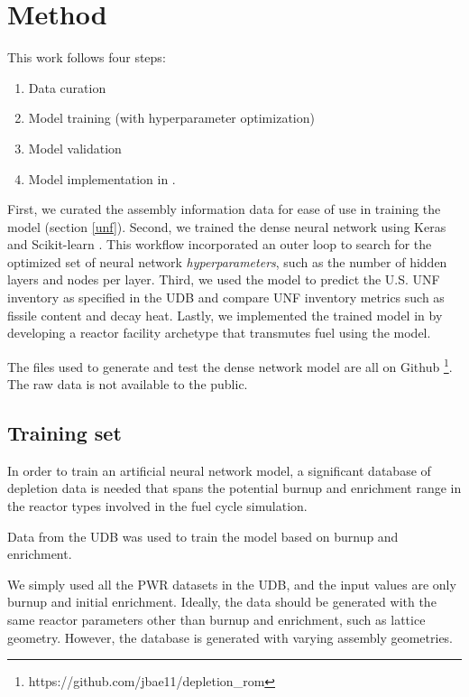 \section{Method}

This work follows four steps:

\begin{enumerate}
\item Data curation
\item Model training (with hyperparameter optimization)
\item Model validation
\item Model implementation in \Cyclus.
\end{enumerate}


First, we curated the
assembly information data for ease of use in training the model
(section \ref{unf}).
Second, we trained the dense neural network using Keras \cite{collet_keras_2015}
and Scikit-learn \cite{pedregosa_scikit-learn_2011}.
This workflow incorporated an outer loop to
search for the optimized set of neural network \textit{hyperparameters},
such as the number of hidden layers and nodes per layer.
Third, we used the model to predict the U.S. \gls{UNF}
inventory as specified in the \gls{UDB} and compare
\gls{UNF} inventory metrics such as fissile content
and decay heat. Lastly, we implemented the trained
model in \Cyclus by developing a reactor facility archetype
that transmutes fuel using the model.

The files used to generate and test the dense network
model are all on Github \footnote{https://github.com/jbae11/depletion\_rom}.
The raw data
is not available to the public.

\subsection{Training set}

In order to train an artificial neural network model, a significant database of
depletion data is needed that spans the potential
burnup and enrichment range in the reactor types involved
in the fuel cycle simulation.

Data from the \gls{UDB} was used to train the model 
based on burnup and enrichment. 

We simply used all the \gls{PWR} datasets in the \gls{UDB},
and the input values are only burnup and initial enrichment.
Ideally, the data should be generated with the same reactor
parameters other than burnup and enrichment, such as lattice geometry.
However, the database is generated with varying
assembly geometries. 


